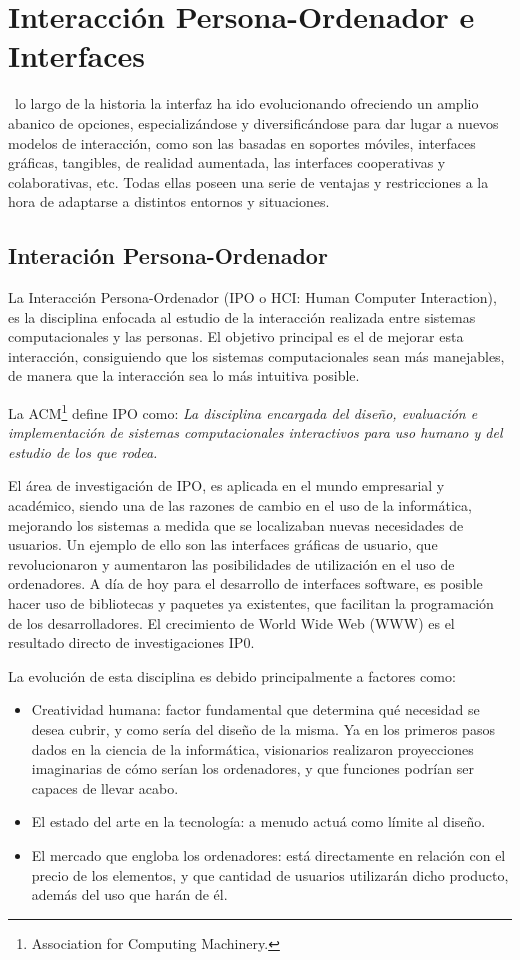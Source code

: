 \chapter{Interacción Persona-Ordenador e Interfaces}
\label{chap:interfaces}
~lo largo de la historia la interfaz ha ido evolucionando ofreciendo un amplio abanico de opciones,
especializándose y diversificándose para dar lugar a nuevos modelos de interacción, como son las basadas en soportes móviles, interfaces gráficas, tangibles, de realidad aumentada, las interfaces cooperativas y colaborativas, etc. Todas ellas poseen una serie de ventajas y restricciones a la hora de adaptarse a distintos entornos y situaciones.


\section{Interación Persona-Ordenador}
La Interacción Persona-Ordenador (IPO o HCI: Human Computer Interaction), es la disciplina enfocada al estudio de la interacción realizada entre sistemas computacionales y las personas. El objetivo principal es el de mejorar esta interacción, consiguiendo que los sistemas computacionales sean más manejables, de manera que la interacción sea lo más intuitiva posible. 

La ACM\footnote{Association for Computing Machinery.} define IPO como: \emph{La disciplina encargada del diseño, evaluación e implementación de sistemas computacionales interactivos para uso humano y del estudio de los que rodea.}

El área de investigación de IPO, es aplicada en el mundo empresarial y académico, siendo una de las razones de cambio en el uso de la informática, mejorando los sistemas a medida que se localizaban nuevas necesidades de usuarios. Un ejemplo de ello son las interfaces gráficas de usuario, que revolucionaron y aumentaron las posibilidades de utilización en el uso de ordenadores. A día de hoy para el desarrollo de interfaces software, es posible hacer uso de bibliotecas y paquetes ya existentes, que facilitan la programación de los desarrolladores. El crecimiento de World Wide Web (WWW) es el resultado directo de investigaciones IP0.

La evolución de esta disciplina es debido principalmente a factores como:
\begin{itemize}
\item Creatividad humana: factor fundamental que determina qué necesidad se desea cubrir, y como sería del diseño de la misma. Ya en los primeros pasos dados en la ciencia de la informática, visionarios realizaron proyecciones imaginarias de cómo serían los ordenadores, y que funciones podrían ser capaces de llevar acabo.
\item El estado del arte en la tecnología: a menudo actuá como límite al diseño.
\item El mercado que engloba los ordenadores: está directamente en relación con el precio de los elementos, y que cantidad de usuarios utilizarán dicho producto, además del uso que harán de él.
\end{itemize}

